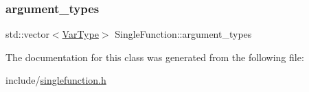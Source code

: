 \subsubsection{\texorpdfstring{argument\+\_\+types}{argument\_types}}
{\footnotesize\ttfamily std\+::vector$<$\hyperlink{classVarType}{Var\+Type}$>$ Single\+Function\+::argument\+\_\+types}



The documentation for this class was generated from the following file\+:\begin{DoxyCompactItemize}
\item 
include/\hyperlink{singlefunction_8h}{singlefunction.\+h}\end{DoxyCompactItemize}
